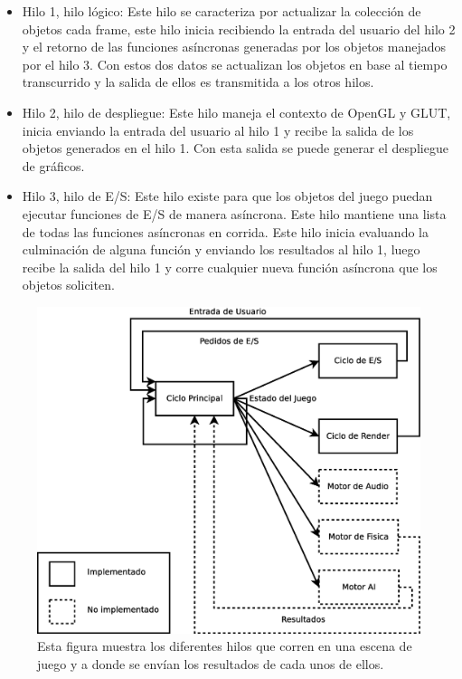 \begin{itemize}
\item Hilo 1, hilo lógico: Este hilo se caracteriza por actualizar la colección de objetos cada frame, este hilo inicia recibiendo la entrada del usuario del hilo 2 y el retorno de las funciones asíncronas generadas por los objetos manejados por el hilo 3. Con estos dos datos se actualizan los objetos en base al tiempo transcurrido y la salida de ellos es transmitida a los otros hilos.
\item Hilo 2, hilo de despliegue: Este hilo maneja el contexto de OpenGL y GLUT, inicia enviando la entrada del usuario al hilo 1 y recibe la salida de los objetos generados en el hilo 1. Con esta salida se puede generar el despliegue de gráficos.
\item Hilo 3, hilo de E/S: Este hilo existe para que los objetos del juego puedan ejecutar funciones de E/S de manera asíncrona. Este hilo mantiene una lista de todas las funciones asíncronas en corrida. Este hilo inicia evaluando la culminación de alguna función y enviando los resultados al hilo 1, luego recibe la salida del hilo 1 y corre cualquier nueva función asíncrona que los objetos soliciten.
\end{itemize}

\begin{figure}[!htbp!]
\centering
\includegraphics[width=1.0\textwidth]{ciclo_de_juego}
\caption[Ciclo de juego]{Esta figura muestra los diferentes hilos que corren en una escena de juego y a donde se envían los resultados de cada unos de ellos.}
\label{fig:ciclo_de_juego}
\end{figure}

